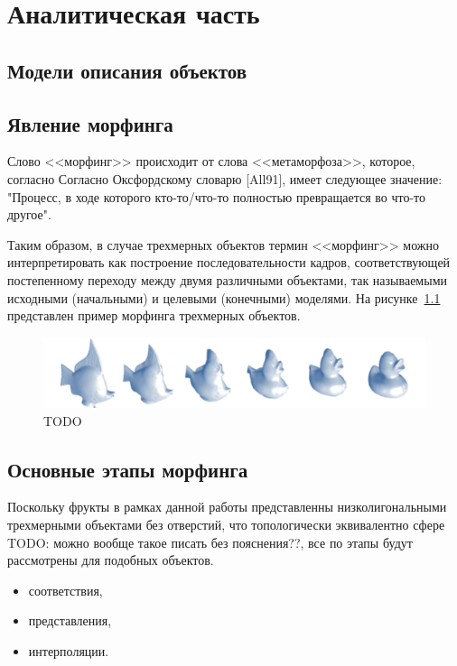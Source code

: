 \chapter{Аналитическая часть}

\section{Модели описания объектов}


\section{Явление морфинга}
    Слово <<морфинг>> происходит от слова <<метаморфоза>>, которое, согласно 
    Согласно Оксфордскому словарю [All91], имеет следующее значение: "Процесс, в ходе которого кто-то/что-то полностью превращается во что-то другое".

    Таким образом, в случае трехмерных объектов термин <<морфинг>> можно интерпретировать как построение последовательности кадров, соответствующей постепенному переходу между двумя различными
    объектами, так называемыми исходными (начальными) и целевыми (конечными) моделями. На рисунке~\ref{fig:morhping_example} представлен пример морфинга трехмерных объектов.
    
    \begin{figure}[H]
		\centering
    	\includegraphics[width=\textwidth]{../inc/images/morhping_sequence}
    	\caption{TODO}
    	\label{fig:morhping_example}  
    \end{figure}

\section{Основные этапы морфинга}
	Поскольку фрукты в рамках данной работы представленны низколигональными трехмерными объектами без отверстий, что топологически эквивалентно сфере TODO: можно вообще такое писать без пояснения??, все по этапы будут рассмотрены для подобных объектов.
	
    \begin{itemize}
    \item соответствия,
   	\item представления,
   	\item интерполяции.
    \end{itemize}
    
